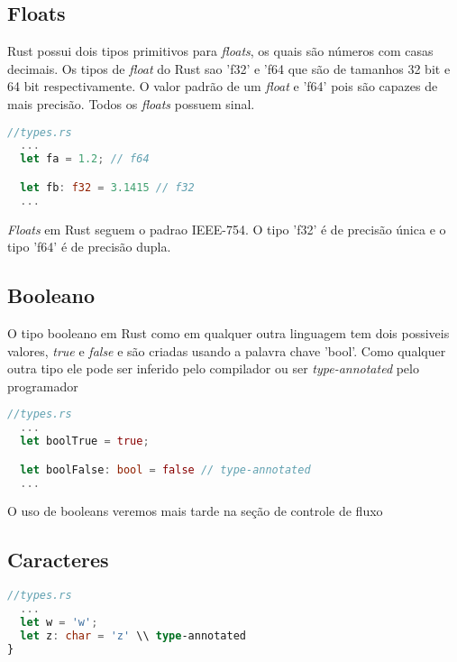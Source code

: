 \subsection{Floats}

Rust possui dois tipos primitivos para \textit{floats}, os quais são números com casas decimais.
Os tipos de \textit{float} do Rust sao 'f32' e 'f64 que são de tamanhos 32 bit e 64 bit respectivamente. O valor padrão de um \textit{float} e 'f64' pois são capazes de mais precisão. Todos os  \textit{floats} possuem sinal.

\begin{lstlisting}[language=rust]
//types.rs
  ...
  let fa = 1.2; // f64

  let fb: f32 = 3.1415 // f32
  ...
\end{lstlisting}

\textit{Floats} em Rust seguem o padrao IEEE-754. O tipo 'f32' é de precisão única e o tipo 'f64' é de precisão dupla.
\pagebreak
\newpage

\subsection{Booleano}

O tipo booleano em Rust como em qualquer outra linguagem tem dois possiveis valores, \textit{true} e \textit{false} e são criadas usando a palavra chave 'bool'. Como qualquer outra tipo ele pode ser inferido pelo compilador ou ser \textit{type-annotated} pelo programador

\begin{lstlisting}[language=rust]
//types.rs
  ...
  let boolTrue = true; 

  let boolFalse: bool = false // type-annotated
  ...
\end{lstlisting}

O uso de booleans veremos mais tarde na seção de controle de fluxo

\subsection{Caracteres}

\begin{lstlisting}[language=rust]
//types.rs
  ...
  let w = 'w';
  let z: char = 'z' \\ type-annotated
}
\end{lstlisting}


